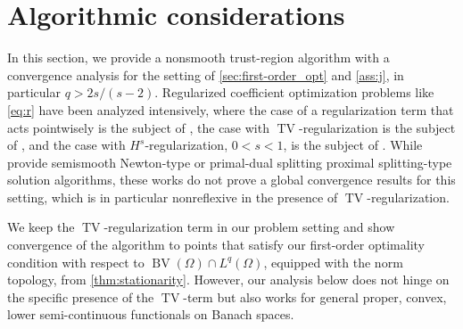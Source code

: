 \documentclass[11pt]{article}
\DeclareMathOperator*{\BV}{BV}
\DeclareMathOperator*{\TV}{TV}
\theoremstyle{definition}
\theoremstyle{remark}
\begin{document}
\section{Algorithmic considerations}\label{sec:tr_algorithm}
%
In this section, we provide a nonsmooth trust-region algorithm with
a convergence analysis for the setting of \cref{sec:first-order_opt}
and \cref{ass:j}, in particular $q > 2s/(s - 2)$.
Regularized coefficient optimization problems like \eqref{eq:r} have been analyzed intensively,
where the case of a regularization term that acts pointwisely is the subject of
\cite{wachsmuth2024control}, the case with $\TV$-regularization is the subject of
\cite{clason2018total,clason2021optimal}, and the case with $H^s$-regularization, $0 < s < 1$, is
the subject of \cite{assmann2013identification}. While \cite{clason2018total,clason2021optimal}
provide semismooth Newton-type or primal-dual splitting proximal splitting-type solution algorithms,
these works do not prove a global convergence results for this setting, which is
in particular nonreflexive in the presence of $\TV$-regularization.

We keep the $\TV$-regularization term in our problem setting and show convergence of
the algorithm to points that satisfy our first-order optimality condition
with respect to $\BV(\Omega) \cap L^q(\Omega)$, equipped with the norm topology,
from \cref{thm:stationarity}. However, our analysis below does not hinge on the specific
presence of the $\TV$-term but also works for general proper, convex, lower semi-continuous
functionals on Banach spaces.
\end{document}
